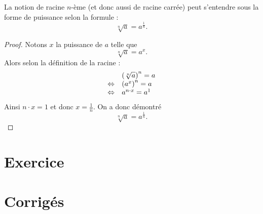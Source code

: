 \begin{theoreme}
La notion de racine $n$-ème (et donc aussi de racine carrée) peut s'entendre sous la forme de puissance selon la formule :
$$
\sqrt[n]{a} = a^{\frac{1}{n}}.
$$ 
\end{theoreme}

\begin{proof}
Notons $x$ la puissance de $a$ telle que 
$$
\sqrt[n]{a} = a^x.
$$
Alors selon la définition de la racine :
$$
\begin{array}{ll}
&\left(\sqrt[n]{a}\right)^n = a \\
\Leftrightarrow & \left(a^x\right)^n = a\\
\Leftrightarrow & a^{n\cdot x} = a^1
\end{array}
$$
Ainsi $n\cdot x = 1$ et donc $x=\frac{1}{n}$. On a donc démontré
$$
\sqrt[n]{a} = a^\frac{1}{n}.
$$
\end{proof}

\section{Exercice}



\section{Corrigés}

